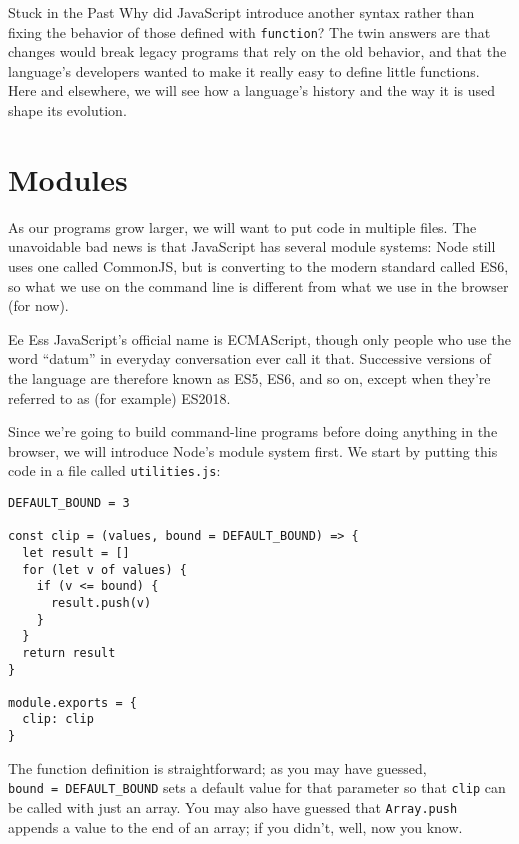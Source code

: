 \begin{aside}{Stuck in the Past}
  Why did JavaScript introduce another syntax
  rather than fixing the behavior of those defined with \texttt{function}?
  The twin answers are that changes would break legacy programs that rely on the old behavior,
  and that the language's developers wanted to make it really easy to define little functions.
  Here and elsewhere,
  we will see how a language's history and the way it is used shape its evolution.
\end{aside}

\section{Modules}\label{s:basics-modules}

As our programs grow larger,
we will want to put code in multiple files.
The unavoidable bad news is that JavaScript has several module systems:
Node still uses one called CommonJS,
but is converting to the modern standard called ES6,
so what we use on the command line is different from what we use in the browser (for now).

\begin{aside}{Ee Ess}
  JavaScript's official name is ECMAScript,
  though only people who use the word ``datum'' in everyday conversation ever call it that.
  Successive versions of the language are therefore known as ES5, ES6, and so on,
  except when they're referred to as (for example) ES2018.
\end{aside}

Since we're going to build command-line programs before doing anything in the browser,
we will introduce Node's module system first.
We start by putting this code in a file called \texttt{utilities.js}:

\begin{verbatim}
DEFAULT_BOUND = 3

const clip = (values, bound = DEFAULT_BOUND) => {
  let result = []
  for (let v of values) {
    if (v <= bound) {
      result.push(v)
    }
  }
  return result
}

module.exports = {
  clip: clip
}
\end{verbatim}

The function definition is straightforward;
as you may have guessed, \texttt{bound\ =\ DEFAULT\_BOUND} sets a default value for that parameter
so that \texttt{clip} can be called with just an array.
You may also have guessed that \texttt{Array.push} appends a value to the end of an array;
if you didn't,
well,
now you know.

